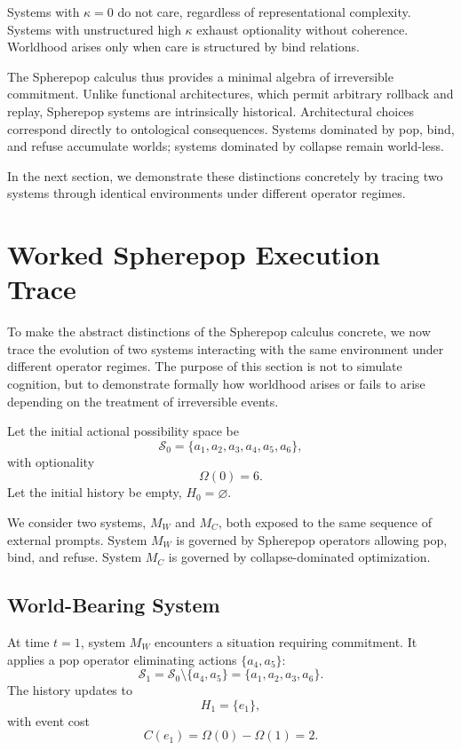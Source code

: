\documentclass[11pt]{article}
\theoremstyle{remark}
\begin{document}
Systems with $\kappa = 0$ do not care, regardless of representational complexity. Systems with unstructured high $\kappa$ exhaust optionality without coherence. Worldhood arises only when care is structured by bind relations.

The Spherepop calculus thus provides a minimal algebra of irreversible commitment. Unlike functional architectures, which permit arbitrary rollback and replay, Spherepop systems are intrinsically historical. Architectural choices correspond directly to ontological consequences. Systems dominated by pop, bind, and refuse accumulate worlds; systems dominated by collapse remain world-less.

In the next section, we demonstrate these distinctions concretely by tracing two systems through identical environments under different operator regimes.

\section{Worked Spherepop Execution Trace}

To make the abstract distinctions of the Spherepop calculus concrete, we now trace the evolution of two systems interacting with the same environment under different operator regimes. The purpose of this section is not to simulate cognition, but to demonstrate formally how worldhood arises or fails to arise depending on the treatment of irreversible events.

Let the initial actional possibility space be
\[
\mathcal{S}_0 = \{a_1, a_2, a_3, a_4, a_5, a_6\},
\]
with optionality
\[
\Omega(0) = 6.
\]
Let the initial history be empty, $H_0 = \varnothing$.

We consider two systems, $M_W$ and $M_C$, both exposed to the same sequence of external prompts. System $M_W$ is governed by Spherepop operators allowing pop, bind, and refuse. System $M_C$ is governed by collapse-dominated optimization.

\subsection{World-Bearing System}

At time $t=1$, system $M_W$ encounters a situation requiring commitment. It applies a pop operator eliminating actions $\{a_4, a_5\}$:
\[
\mathcal{S}_1 = \mathcal{S}_0 \setminus \{a_4, a_5\} = \{a_1, a_2, a_3, a_6\}.
\]
The history updates to
\[
H_1 = \{e_1\},
\]
with event cost
\[
C(e_1) = \Omega(0) - \Omega(1) = 2.
\]
\end{document}
